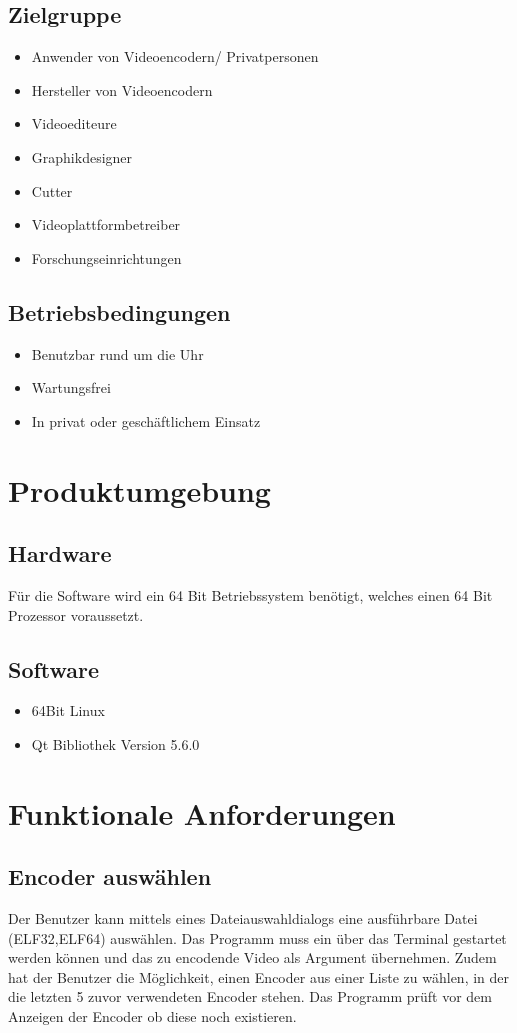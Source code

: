 \documentclass[parskip=full]{scrartcl}
\begin{document}
\subsection{Zielgruppe}
\begin{itemize}
\item Anwender von Videoencodern/ Privatpersonen
\item Hersteller von Videoencodern
\item Videoediteure
\item Graphikdesigner
\item Cutter
\item Videoplattformbetreiber
\item Forschungseinrichtungen
\end{itemize}
\subsection{Betriebsbedingungen}
\begin{itemize}
\item Benutzbar rund um die Uhr
\item Wartungsfrei
\item In privat oder geschäftlichem Einsatz
\end{itemize}
\newpage
\section{Produktumgebung}

\subsection{Hardware}
Für die Software wird ein 64 Bit Betriebssystem benötigt, welches einen 64 Bit Prozessor voraussetzt.

\subsection{Software}
\begin{itemize}
\item 64Bit Linux
\item Qt Bibliothek Version 5.6.0
\end{itemize}
\newpage
\section{Funktionale Anforderungen}
\subsection{Encoder auswählen}
Der Benutzer kann mittels eines Dateiauswahldialogs eine ausführbare Datei (ELF32,ELF64) auswählen.
Das Programm muss ein über das Terminal gestartet werden können und das zu encodende Video als
Argument übernehmen.
Zudem hat der Benutzer die Möglichkeit, einen Encoder aus einer Liste zu wählen, in der die letzten 5 zuvor
verwendeten Encoder stehen. Das Programm prüft vor dem Anzeigen der Encoder ob diese noch existieren.
\end{document}
